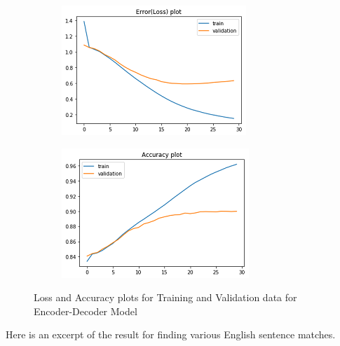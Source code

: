 \documentclass[runningheads]{llncs}
\begin{document}
	\begin{figure}[H]
		\begin{subfigure}[b]{0.49\textwidth}
			\includegraphics[width=\textwidth]{Por-Eng-Train_Loss.png}
			\label{fig:f1}
		\end{subfigure}
		\hfill
		\begin{subfigure}[b]{0.49\textwidth}
			\includegraphics[width=\textwidth]{Por-Eng-Train_Acc.png}
			\label{fig:f2}
		\end{subfigure}
		\caption{Loss and Accuracy plots for Training and Validation data for Encoder-Decoder Model}
	\end{figure}
	\afterpage{\clearpage}

	Here is an excerpt of the result for finding various English sentence matches.
	
\end{document}
